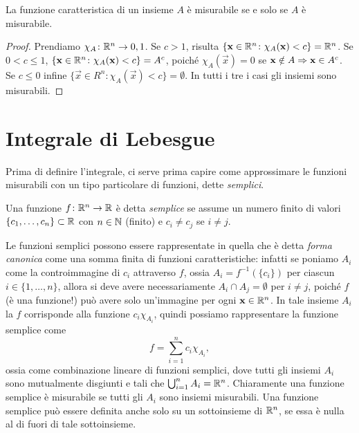 \begin{osservazione} \label{o:funzione-caratteristica-misurabile}
	La funzione caratteristica di un insieme $A$ è misurabile se e solo se $A$ è misurabile.
\end{osservazione}
\begin{proof}
	Prendiamo $\chi_A\colon\mathbb{R}^n\to{0,1}$.
	Se $c>1$, risulta $\{\mathbf{x}\in \mathbb{R}^n\colon\chi_A(\mathbf{x})<c\}=\mathbb{R}^n$.
	Se $0<c\leq1$, $\{\mathbf{x}\in \mathbb{R}^n\colon \chi_A(\mathbf{x})<c\}={A}^c$, poich\'e $\chi_A(\vec x)=0$ se $\mathbf{x}\notin A\Rightarrow\mathbf{x}\in{A}^c$.
	Se $c\leq 0$ infine $\{\vec x\in R^n\colon \chi_A(\vec x)<c\}=\emptyset$.
	In tutti i tre i casi gli insiemi sono misurabili.
\end{proof}

\section{Integrale di Lebesgue}
Prima di definire l'integrale, ci serve prima capire come approssimare le funzioni misurabili con un tipo particolare di funzioni, dette \emph{semplici}.
\begin{definizione} \label{d:funzione-semplice}
	Una funzione $f\colon\mathbb{R}^n\to\mathbb{R}$ è detta \emph{semplice} se assume un numero finito di valori $\{c_1,\dots,c_n\}\subset\mathbb{R}$ con $n\in\mathbb{N}$ (finito) e $c_i\neq c_j$ se $i\neq j$.
\end{definizione}
Le funzioni semplici possono essere rappresentate in quella che è detta \emph{forma canonica} come una somma finita di funzioni caratteristiche: infatti se poniamo $A_i$ come la controimmagine di $c_i$ attraverso $f$, ossia $A_i=f^{-1}(\{c_i\})$ per ciascun $i\in\{1,\dots,n\}$, allora si deve avere necessariamente $A_i\cap A_j=\emptyset$ per $i\neq j$, poich\'e $f$ (è una funzione!) può avere solo un'immagine per ogni $\mathbf{x}\in\mathbb{R}^n$.
In tale insieme $A_i$ la $f$ corrisponde alla funzione $c_i\chi_{A_i}$, quindi possiamo rappresentare la funzione semplice come
\begin{equation}
	f=\sum_{i=1}^nc_i\chi_{A_i},
	\label{eq:rappresentazione-canonica-funzione-semplice}
\end{equation}
ossia come combinazione lineare di funzioni semplici, dove tutti gli insiemi $A_i$ sono mutualmente disgiunti e tali che $\bigcup_{i=1}^nA_i=\mathbb{R}^n$.
Chiaramente una funzione semplice è misurabile se tutti gli $A_i$ sono insiemi misurabili.
Una funzione semplice può essere definita anche solo su un sottoinsieme di $\mathbb{R}^n$, se essa è nulla al di fuori di tale sottoinsieme.

